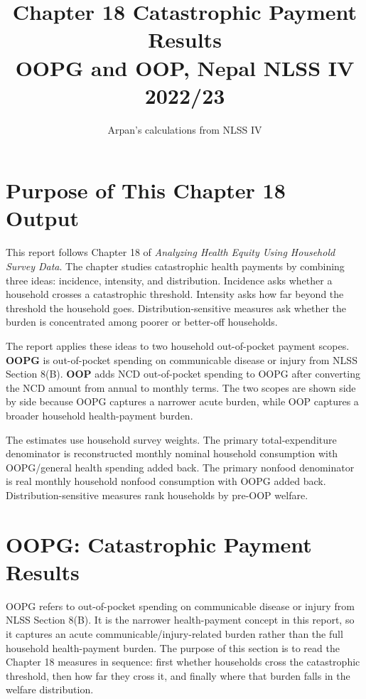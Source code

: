 \documentclass[11pt]{article}
\title{\textbf{Chapter 18 Catastrophic Payment Results}\\
\large OOPG and OOP, Nepal NLSS IV 2022/23}
\author{Arpan's calculations from NLSS IV}
\date{}
\begin{document}
\maketitle

\section*{Purpose of This Chapter 18 Output}

This report follows Chapter 18 of \emph{Analyzing Health Equity Using Household
Survey Data}. The chapter studies catastrophic health payments by combining
three ideas: incidence, intensity, and distribution. Incidence asks whether a
household crosses a catastrophic threshold. Intensity asks how far beyond the
threshold the household goes. Distribution-sensitive measures ask whether the
burden is concentrated among poorer or better-off households.

The report applies these ideas to two household out-of-pocket payment scopes.
\textbf{OOPG} is out-of-pocket spending on communicable disease or injury from
NLSS Section 8(B). \textbf{OOP} adds NCD out-of-pocket spending to OOPG after
converting the NCD amount from annual to monthly terms. The two scopes are shown
side by side because OOPG captures a narrower acute burden, while OOP captures a
broader household health-payment burden.

The estimates use household survey weights. The primary total-expenditure
denominator is reconstructed monthly nominal household consumption with
OOPG/general health spending added back. The primary nonfood denominator is real
monthly household nonfood consumption with OOPG added back.
Distribution-sensitive measures rank households by pre-OOP welfare.


\clearpage
\section*{OOPG: Catastrophic Payment Results}

OOPG refers to out-of-pocket spending on communicable disease or injury from NLSS Section 8(B). It is the narrower health-payment concept in this report, so it captures an acute communicable/injury-related burden rather than the full household health-payment burden. The purpose of this section is to read the Chapter 18
measures in sequence: first whether households cross the catastrophic threshold,
then how far they cross it, and finally where that burden falls in the welfare
distribution.
\end{document}
